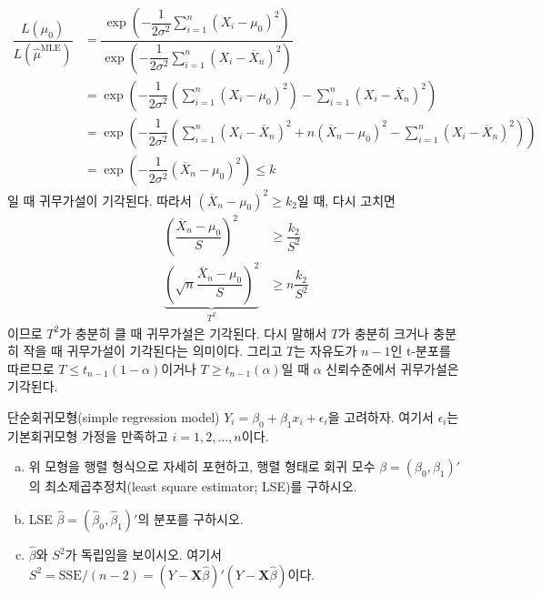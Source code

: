 \documentclass[answers]{exam}
\begin{document}
\begin{questions}
\begin{solution}
\begin{align}
        \dfrac{L\left(\mu_{0}\right)}{L\left(\widehat{\mu}^{\text{MLE}}\right)} &= \dfrac{\exp\left(-\dfrac{1}{2\sigma^{2}}\sum_{i=1}^{n}\left(X_{i}-\mu_{0}\right)^{2}\right)}{\exp\left(-\dfrac{1}{2\sigma^{2}}\sum_{i=1}^{n}\left(X_{i}-\overline{X}_{n}\right)^{2}\right)}\\
        &= \exp\left(-\dfrac{1}{2\sigma^{2}}\left(\sum_{i=1}^{n}\left(X_{i}-\mu_{0}\right)^{2}\right)-\sum_{i=1}^{n}\left(X_{i}-\overline{X}_{n}\right)^{2} \right)\\
        &= \exp\left(-\dfrac{1}{2\sigma^{2}}\left(\sum_{i=1}^{n}\left(X_{i}-\overline{X}_{n}\right)^{2}+n\left(\overline{X}_{n}-\mu_{0}\right)^{2}-\sum_{i=1}^{n}\left(X_{i}-\overline{X}_{n}\right)^{2}\right)\right)\\
        &= \exp\left(-\dfrac{1}{2\sigma^{2}}\left(\overline{X}_{n}-\mu_{0}\right)^{2}\right)\leq k
      \end{align}
      일 때 귀무가설이 기각된다. 따라서 $\left(\overline{X}_{n}-\mu_{0}\right)^{2}\geq k_{2}$일 때, 다시 고치면
      \begin{align}
        \left(\dfrac{\overline{X}_{n}-\mu_{0}}{S}\right)^{2} &\geq \dfrac{k_{2}}{S^{2}}\\
        \underbrace{\left(\sqrt{n}\dfrac{\overline{X}_{n}-\mu_{0}}{S}\right)^{2}}_{T^{2}} &\geq n\dfrac{k_{2}}{S^{2}}
      \end{align}
      이므로 $T^{2}$가 충분히 클 때 귀무가설은 기각된다. 다시 말해서 $T$가 충분히 크거나 충분히 작을 때 귀무가설이 기각된다는 의미이다. 그리고 $T$는 자유도가 $n-1$인 t-분포를 따르므로 $T\leq t_{n-1}\left(1-\alpha\right)$이거나 $T\geq t_{n-1}\left(\alpha\right)$일 때 $\alpha$ 신뢰수준에서 귀무가설은 기각된다.
    \end{solution}
    \newpage
    \question
    단순회귀모형(simple regression model) $Y_{i}=\beta_{0}+\beta_{1}x_{i}+\epsilon_{i}$을 고려하자. 여기서 $\epsilon_{i}$는 기본회귀모형 가정을 만족하고 $i=1,2,\ldots,n$이다.
    \begin{enumerate}[(a)]
      \item 위 모형을 행렬 형식으로 자세히 포현하고, 행렬 형태로 회귀 모수 $\beta=\left(\beta_{0},\beta_{1}\right)'$의 최소제곱추정치(least square estimator; LSE)를 구하시오.
      \item LSE $\widehat{\beta}=\left(\widehat{\beta}_{0},\widehat{\beta}_{1}\right)'$의 분포를 구하시오.
      \item $\widehat{\beta}$와 $S^{2}$가 독립임을 보이시오. 여기서 $S^{2}=\mathrm{SSE}/\left(n-2\right)=\left(Y-\mathbf{X}\widehat{\beta}\right)'\left(Y-\mathbf{X}\widehat{\beta}\right)$이다.

\end{enumerate}
\end{questions}
\end{document}
